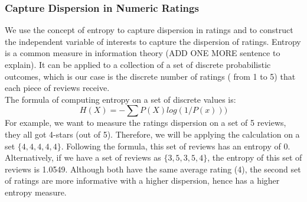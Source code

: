 \documentclass[msom,blindrev]{informs3}
\begin{document}
\subsubsection{Capture Dispersion in Numeric Ratings}
We use the concept of entropy to capture dispersion in ratings and to construct the independent variable of interests to capture the dispersion of ratings. Entropy is a common measure in information theory (ADD ONE MORE sentence to explain). It can be applied to a collection of a set of discrete probabilistic outcomes, which is our case is the discrete number of ratings ( from 1 to 5) that each piece of reviews receive. \\ 
The formula of computing entropy on a set of discrete values is:  \\ 
\begin{equation}
H(X)=-\sum P(X)log(1/P(x)))
\end{equation}
For example, we want to measure the ratings dispersion on a set of 5 reviews, they all got 4-stars (out of 5). Therefore, we will be applying the calculation on a set $\{4,4,4,4,4\}$. Following the formula, this set of reviews has an entropy of 0. Alternatively, if we have a set of reviews as $\{3,5,3,5,4\}$, the entropy of this set of reviews is 1.0549.  Although both have the same average rating (4), the second set of ratings are more informative with a higher dispersion, hence has a higher entropy measure. \\
\end{document}

